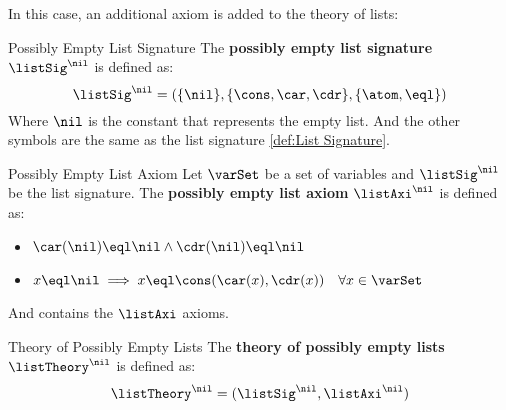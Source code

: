 In this case, an additional axiom is added to the theory of lists:

\begin{definition}{Possibly Empty List Signature}
    The \textbf{possibly empty list signature} $\listSig^\nil$ is defined as:
    \begin{equation*}
        \listSig^\nil = (\{\nil\},\{\cons, \car, \cdr\},\{\atom,\eql\})
    \end{equation*}
    Where $\nil$ is the constant that represents the empty list.
    And the other symbols are the same as the list signature \ref{def:List Signature}.
\end{definition}

\begin{definition}{Possibly Empty List Axiom}
    Let $\varSet$ be a set of variables and $\listSig^\nil$ be the list signature.
    The \textbf{possibly empty list axiom} $\listAxi^\nil$ is defined as:
    \begin{itemize}
        \item $\car(\nil) \eql \nil \land \cdr(\nil) \eql \nil$
        \item $x \eql \nil \implies x \eql \cons(\car(x),\cdr(x)) \quad 
        \forall x \in \varSet$
    \end{itemize}
    And contains the $\listAxi$ axioms.
\end{definition}

\begin{definition}{Theory of Possibly Empty Lists}
    The \textbf{theory of possibly empty lists} $\listTheory^\nil$ is defined as:
    \begin{equation*}
        \listTheory^\nil = (\listSig^\nil,\listAxi^\nil)
    \end{equation*}
\end{definition}